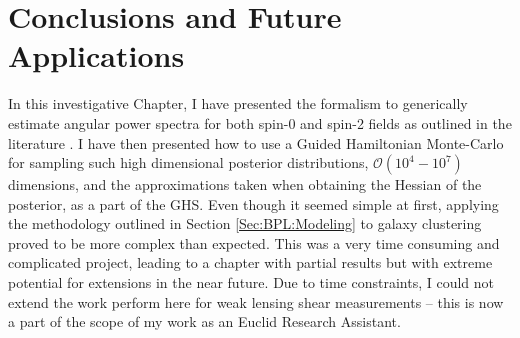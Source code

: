 

\section{Conclusions and Future Applications}
In this investigative Chapter, I have presented the formalism to generically estimate angular power spectra for both spin-0 and spin-2 fields as outlined in the literature \citep{Borrill1999, Hobson2002, Taylor2008,SreeThesis}. I have then presented how to use a Guided Hamiltonian Monte-Carlo for sampling such high dimensional posterior distributions, $\mathcal{O}(10^{4}-10^{7})$ dimensions, and the approximations taken when obtaining the Hessian of the posterior, as a part of the GHS. Even though it seemed simple at first, applying the methodology outlined in Section \ref{Sec:BPL:Modeling} to galaxy clustering proved to be more complex than expected. This was a very time consuming and complicated project, leading to a chapter with partial results but with extreme potential for extensions in the near future. Due to time constraints, I could not extend the work perform here for weak lensing shear measurements -- this is now a part of the scope of my work as an Euclid Research Assistant. 

